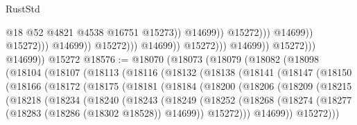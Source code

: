 \begin{lexlean}{RustStd}
\begin{coremodule}
                                                              @18
                                                              @52
                                                              @4821
                                                              @4538
                                                              @16751
                                                              @15273))
                                                          @14699))
                                                      @15272)))
                                                @14699))
                                            @15272)))
                                      @14699))
                                  @15272)))
                            @14699))
                        @15272)))
                  @14699))
              @15272)))
        @14699))
    @15272
@18576 := @18070
    (@18073
      (@18079
        (@18082
          (@18098
            (@18104
              (@18107
                (@18113
                  (@18116
                    (@18132
                      (@18138
                        (@18141
                          (@18147
                            (@18150
                              (@18166
                                (@18172
                                  (@18175
                                    (@18181
                                      (@18184
                                        (@18200
                                          (@18206
                                            (@18209
                                              (@18215
                                                (@18218
                                                  (@18234
                                                    (@18240
                                                      (@18243
                                                        (@18249
                                                          (@18252
                                                            (@18268
                                                              (@18274
                                                                (@18277
                                                                  (@18283
                                                                    (@18286 (@18302 @18528))
                                                                    @14699))
                                                                @15272)))
                                                          @14699))
                                                      @15272)))

\end{coremodule}
\end{lexlean}

